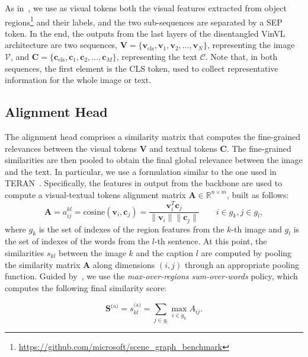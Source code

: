 \documentclass[sigconf]{acmart}
\begin{document}
As in~\citep{zhang2021vinvl}, we use as visual tokens both the visual features extracted from object regions\footnote{\url{https://github.com/microsoft/scene\_graph\_benchmark}} and their labels, and the two sub-sequences are separated by a SEP token.
In the end, the outputs from the last layers of the disentangled VinVL architecture are two sequences, $\boldsymbol{V} = \{\boldsymbol{v}_\text{cls}, \boldsymbol{v}_1, \boldsymbol{v}_2,\ldots,\boldsymbol{v}_N\}$, representing the image $\mathcal{V}$, and $\boldsymbol{C} = \{\boldsymbol{c}_\text{cls}, \boldsymbol{c}_1, \boldsymbol{c}_2,\ldots,\boldsymbol{c}_M\}$, representing the text $\mathcal{C}$.
Note that, in both sequences, the first element is the CLS token, used to collect representative information for the whole image or text.

\subsection{Alignment Head}
The alignment head comprises a similarity matrix that computes the fine-grained relevances between the visual tokens $\boldsymbol{V}$ and textual tokens $\boldsymbol{C}$. The fine-grained similarities are then pooled to obtain the final global relevance between the image and the text. In particular, we use a formulation similar to the one used in TERAN~\citep{messina2021fine}.
Specifically, the features in output from the backbone are used to compute a visual-textual tokens alignment matrix $\boldsymbol{A} \in \mathbb{R}^{n \times m}$, built as follows: \begin{equation}
    \boldsymbol{A} = a_{ij}^{kl} = \text{cosine}(\boldsymbol{v}_i, \boldsymbol{c}_j) = \frac{\boldsymbol{v}_i^T \boldsymbol{c}_j}{\| \boldsymbol{v}_i \| \| \boldsymbol{c}_j \|} \qquad i \in g_k, j \in g_l, \label{eq:alignment-matrix}
\end{equation}
where $g_k$ is the set of indexes of the region features from the $k$-th image and $g_l$ is the set of indexes of the words from the $l$-th sentence. At this point, the similarities $s_{kl}$ between the image $k$ and the caption $l$ are computed by pooling the similarity matrix $\boldsymbol{A}$ along dimensions $(i, j)$ through an appropriate pooling function. Guided by~\citep{messina2021fine}, we use the \textit{max-over-regions sum-over-words} policy, which computes the following final similarity score:

\begin{equation}
    \boldsymbol{S}^\text{(a)} = s^\text{(a)}_{kl} = \sum_{j \in g_l}\max_{i \in g_k} {A_{ij}}.
\end{equation}
\end{document}
